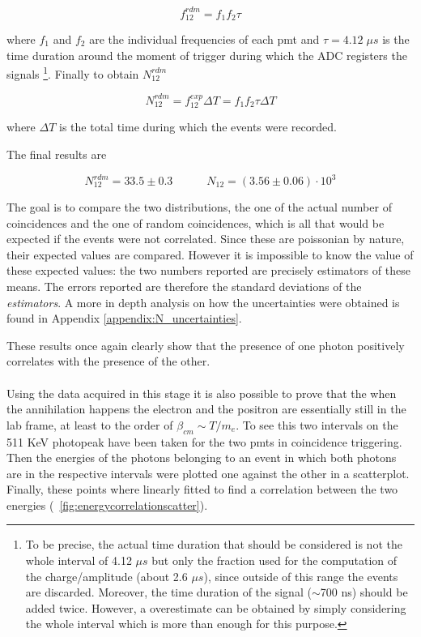 \documentclass[10pt,a4paper,twocolumn]{article}
\begin{document}
$$ f_{12}^{rdm}=f_1f_2\tau $$

\noindent where $f_1$ and $f_2$ are the individual frequencies of each pmt and $\tau = 4.12 \; \mu s$ is the time duration around the moment of trigger during which the ADC registers the signals \footnote{To be precise, the actual time duration that should be considered is not the whole interval of 4.12 $\mu s$ but only the fraction used for the computation of the charge/amplitude (about 2.6 $\mu s$), since outside of this range the events are discarded. Moreover, the time duration of the signal ($\sim $700 ns) should be added twice. However, a overestimate can be obtained by simply considering the whole interval which is more than enough for this purpose.}.
Finally to obtain $N_{12}^{rdm}$ 


\begin{equation}
    \label{eqn:N12rdm}
    N_{12}^{rdm}=  f_{12}^{exp} \Delta T=f_1f_2\tau \Delta T
\end{equation}
 

\noindent where $\Delta T$ is the total time during which the events were recorded.

\noindent The final results are

$$ N_{12}^{rdm}= 33.5 \pm 0.3 \quad \quad \quad N_{12}= (3.56 \pm 0.06) \cdot 10^3  $$

\noindent The goal is to compare the two distributions, the one of the actual number of coincidences and the one of random coincidences, which is all that would be expected if the events were not correlated. Since these are poissonian by nature, their expected values are compared. However it is impossible to know the value of these expected values: the two numbers reported are precisely estimators of these means. The errors reported are therefore the standard deviations of the \textit{estimators}. A more in depth analysis on how the uncertainties were obtained is found in Appendix \ref{appendix:N_uncertainties}.

These results once again clearly show that the presence of one photon positively correlates with the presence of the other.
\\
\\
Using the data acquired in this stage it is also possible to prove that the when the annihilation happens the electron and the positron are essentially still in the lab frame, at least to the order of $\beta_{cm} \sim T/m_e$. To see this two intervals on the 511 KeV photopeak have been taken for the two pmts in coincidence triggering. Then the energies of the photons belonging to an event in which both photons are in the respective intervals were plotted one against the other in a scatterplot. Finally, these points where linearly fitted to find a correlation between the two energies (\figurename~\ref{fig:energycorrelationscatter}).
 
\end{document}
